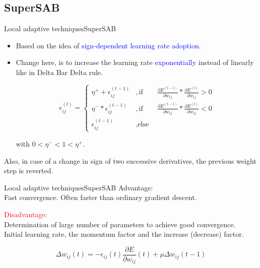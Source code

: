 \documentclass{beamer}
\begin{document}
\subsection{SuperSAB}
\begin{frame}{Local adaptive techniques}{SuperSAB}
	\begin{itemize}
\item Based on the idea of \textcolor{blue}{sign-dependent learning rate adoption}. \\

\item Change here, is to increase the learning rate \textcolor{blue}{exponentially } instead of linearly like in Delta Bar Delta rule. 

\pause
\[
\epsilon_{ij}^{(t)} = \begin{cases}
\eta^+ + \epsilon_{ij}^{(t-1)} & ,  \text{if} \qquad \frac{\partial E^{(t-1)}}{\partial w_{ij}} * \frac{\partial E^{(t)}}{\partial w_{ij}} > 0 \\

\eta^- * \epsilon_{ij}^{(t-1)} & ,  \text{if} \qquad \frac{\partial E^{(t-1)}}{\partial w_{ij}} * \frac{\partial E^{(t)}}{\partial w_{ij}} < 0 \\

\epsilon_{ij}^{(t-1)} & ,  \text{else}

\end{cases}
\]

with $  0< \eta^- < 1 < \eta^+ $. 		
	\end{itemize}
Also, in case of a change in sign of two successive derivatives, the previous weight step is reverted.

\end{frame}	

\begin{frame}{Local adaptive techniques}{SuperSAB}
Advantage:\\
Fast convergence. Often faster than ordinary gradient descent. 
\vspace{4mm}

\textcolor{red}{Disadvantage}:\\
Determination of large number of parameters to achieve good convergence. \\
Initial learning rate, the momentum factor 	and the increase (decrease) factor. 
	
\begin{equation*}
\Delta w_{ij} (t)  = -\epsilon_{ij}(t) \frac{\partial E}{\partial w_{ij}}(t) + \mu \Delta w_{ij} (t-1) 
\end{equation*}	
	
\end{frame}	
\end{document}
